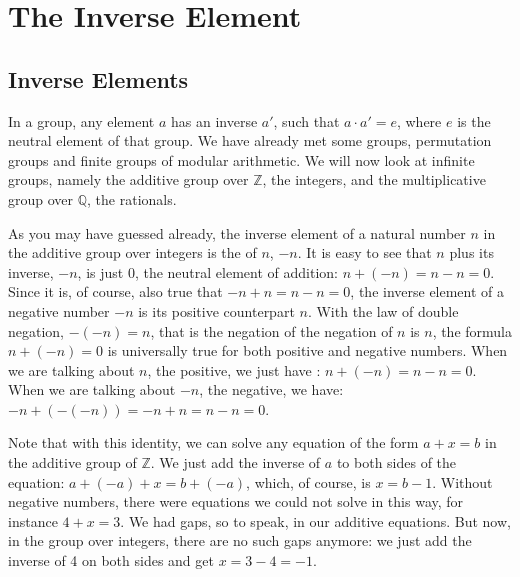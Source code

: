 \documentclass[tikz]{scrreprt}
\newcommand{\texfamily}{\fontfamily{cmtex}\selectfont}
\begin{document}
\setlength{\parindent}{0pt}
\setlength{\parskip}{8pt}

\chapter{The Inverse Element} %
\section{Inverse Elements}
\ignore{
\begin{tabbing}\texfamily
{\bfseries module}~{\itshape Invel}\\
\texfamily {\bfseries where}\\
\texfamily ~~{\bfseries import}~{\itshape Natural}
\end{tabbing}
}

In a group, any element $a$ has an inverse $a'$,
such that $a \cdot a' = e$, where $e$ is
the neutral element of that group.
We have already met some groups, permutation groups
and finite groups of modular arithmetic.
We will now look at infinite groups, namely 
the additive group over $\mathbb{Z}$, the integers, and
the multiplicative group over $\mathbb{Q}$, the rationals.

As you may have guessed already,
the inverse element of a natural
number $n$ in the additive group over integers 
is the  of $n$, $-n$.
It is easy to see that $n$ plus its inverse,
$-n$, is just $0$, the neutral element of addition:
$n + (-n) = n - n = 0$.
Since it is, of course, also true
that $-n + n = n - n = 0$,
the inverse element of a negative number $-n$
is its positive counterpart $n$.
With the law of double negation, $-(-n) = n$,
that is the negation of the negation of $n$ is $n$,
the formula $n + (-n) = 0$ 
is universally true for both
positive and negative numbers.
When we are talking about $n$, the positive,
we just have : $n + (-n) = n - n = 0$.
When we are talking about $-n$, the negative,
we have: $-n + (-(-n)) = -n + n = n - n = 0$.

Note that with this identity, we can solve
any equation of the form
$a + x = b$ in the additive group of $\mathbb{Z}$.
We just add the inverse of $a$ to both sides
of the equation: $a + (-a) + x = b + (-a)$,
which, of course, is $x = b - 1$.
Without negative numbers, there were equations
we could not solve in this way, for instance
$4 + x = 3$. We had gaps, so to speak,
in our additive equations. But now,
in the group over integers, there are no such
gaps anymore: we just add the inverse of 4
on both sides and get $x = 3 - 4 = -1$.
\end{document}
